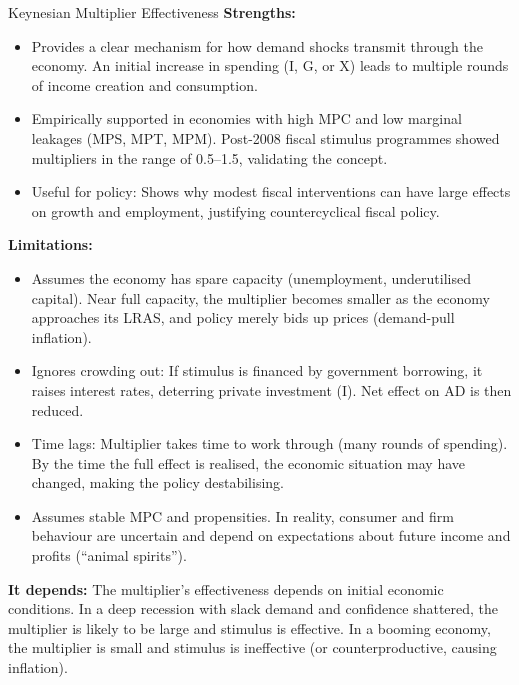 \documentclass[11pt, a4paper, twoside]{book}
\begin{document}
\begin{evaluation}{Keynesian Multiplier Effectiveness}
\textbf{Strengths:}
\begin{itemize}
  \item Provides a clear mechanism for how demand shocks transmit through the economy. An initial increase in spending (I, G, or X) leads to multiple rounds of income creation and consumption.
  \item Empirically supported in economies with high MPC and low marginal leakages (MPS, MPT, MPM). Post-2008 fiscal stimulus programmes showed multipliers in the range of 0.5--1.5, validating the concept.
  \item Useful for policy: Shows why modest fiscal interventions can have large effects on growth and employment, justifying countercyclical fiscal policy.
\end{itemize}

\textbf{Limitations:}
\begin{itemize}
  \item Assumes the economy has spare capacity (unemployment, underutilised capital). Near full capacity, the multiplier becomes smaller as the economy approaches its LRAS, and policy merely bids up prices (demand-pull inflation).
  \item Ignores crowding out: If stimulus is financed by government borrowing, it raises interest rates, deterring private investment (I). Net effect on AD is then reduced.
  \item Time lags: Multiplier takes time to work through (many rounds of spending). By the time the full effect is realised, the economic situation may have changed, making the policy destabilising.
  \item Assumes stable MPC and propensities. In reality, consumer and firm behaviour are uncertain and depend on expectations about future income and profits (``animal spirits'').
\end{itemize}

\textbf{It depends:}
The multiplier's effectiveness depends on initial economic conditions. In a deep recession with slack demand and confidence shattered, the multiplier is likely to be large and stimulus is effective. In a booming economy, the multiplier is small and stimulus is ineffective (or counterproductive, causing inflation).
\end{evaluation}
\end{document}

